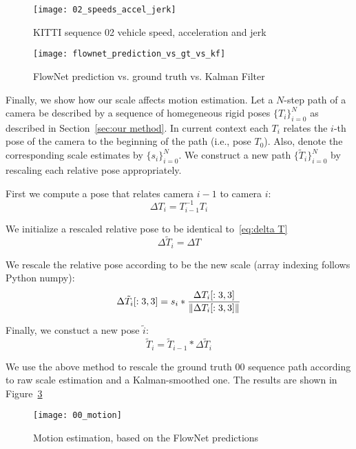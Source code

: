 \begin{figure}[!ht]
  \centering
  \texttt{[image: 02\_speeds\_accel\_jerk]}
  \caption{KITTI sequence 02 vehicle speed, acceleration and jerk}
  \label{fig:02 stats}
\end{figure}

\begin{figure}[!ht]
  \centering
  \texttt{[image: flownet\_prediction\_vs\_gt\_vs\_kf]}
  \caption{FlowNet prediction vs. ground truth vs. Kalman Filter}
  \label{fig:pred_vs_gt_vs_ekf}
\end{figure}

Finally, we show how our scale affects motion estimation.  Let a
$N$-step path of a camera be described by a sequence of homegeneous
rigid poses $\{T_i\}_{i=0}^N$ as described in Section~\ref{sec:our
  method}.  In current context each $T_i$ relates the $i$-th pose of
the camera to the beginning of the path (i.e., pose $T_0$).  Also,
denote the corresponding scale estimates by $\{s_i\}_{i=0}^N$.  We
construct a new path $\{\tilde{T}_i\}_{i=0}^N$ by rescaling each
relative pose appropriately.

First we compute a pose that relates camera $i-1$ to camera $i$:
\begin{equation}\label{eq:delta T}
  \Delta T_i = T_{i-1}^{-1}T_i
\end{equation}

We initialize a rescaled relative pose to be identical to~\ref{eq:delta T}
\begin{equation}
  \Delta \tilde{T}_i = \Delta T
\end{equation}

We rescale the relative pose according to be the new scale (array
indexing follows Python numpy):
\begin{equation}
  \Delta \tilde{T}_i[:3,3] = s_i * \frac{\Delta T_i[:3,3]}{\lVert\Delta T_i[:3,3]\rVert}
\end{equation}

Finally, we constuct a new pose $\tilde{i}$:
\begin{equation}
  \tilde{T}_i = \tilde{T}_{i-1} * \Delta \tilde{T}_i
\end{equation}

We use the above method to rescale the ground truth 00 sequence path
according to raw scale estimation and a Kalman-smoothed one.  The
results are shown in Figure~\ref{fig:00_motion}
\begin{figure}[!ht]
  \centering
  \texttt{[image: 00\_motion]}
  \caption{Motion estimation, based on the FlowNet predictions}
  \label{fig:00_motion}
\end{figure}

